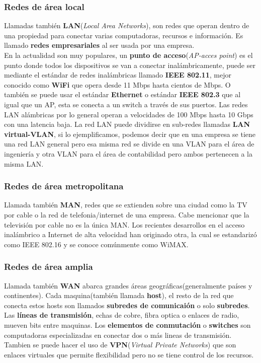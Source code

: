 \documentclass[
	11pt, %
	fleqn, %
	a4paper, %
]{LegrandOrangeBook}
\begin{document}
\subsubsection{Redes de área local}
Llamadas también \textbf{LAN}(\textit{Local Area Networks}), son redes que operan dentro de una propiedad para conectar varias computadoras, recursos e información. Es llamado \textbf{redes empresariales} al ser usada por una empresa.\\
En la actualidad son muy populares, un \textbf{punto de acceso}(\textit{AP-acces point}) es el punto donde todos los dispositivos se van a conectar inalámbricamente, puede ser mediante el estándar de redes inalámbricas llamado \textbf{IEEE 802.11}, mejor conocido como \textbf{WiFi} que opera desde 11 Mbps hasta cientos de Mbps. O también se puede usar el estándar \textbf{Ethernet} o estándar \textbf{IEEE 802.3} que al igual que un AP, esta se conecta a un switch a través de sus puertos. Las redes LAN alámbricas por lo general operan a velocidades de 100 Mbps hasta 10 Gbps con una latencia baja. La red LAN puede dividirse en sub-redes llamadas \textbf{LAN virtual-VLAN}, si lo ejemplificamos, podemos decir que en una empresa se tiene una red LAN general pero esa misma red se divide en una VLAN para el área de ingeniería y otra VLAN para el área de contabilidad pero ambos pertenecen a la misma LAN.
\subsubsection{Redes de área metropolitana}
Llamada también \textbf{MAN}, redes que se extienden sobre una ciudad como la TV por cable o la red de telefonia/internet de una empresa. Cabe mencionar que la televisión por cable no es la única MAN. Los recientes desarrollos en
el acceso inalámbrico a Internet de alta velocidad han originado otra, la cual se estandarizó como IEEE 802.16 y se conoce comúnmente como WiMAX.
\subsubsection{Redes de área amplia}
Llamada también \textbf{WAN} abarca grandes áreas geográficas(generalmente países y continentes). Cada maquina(también llamada \textbf{host}), el resto de la red que conecta estos hosts son llamados \textbf{subredes de comunicaión} o solo \textbf{subredes}. Las \textbf{líneas de transmisión}, echas de cobre, fibra optica o enlaces de radio, mueven bits entre maquinas. Los \textbf{elementos de conmutación} o \textbf{switches} son computadoras especializadas en conectar dos o más lineas de transmisión. Tambien se puede hacer el uso de \textbf{VPN}(\textit{Virtual Private Networks}) que son enlaces virtuales que permite flexibilidad pero no se tiene control de los recursos.
\end{document}
